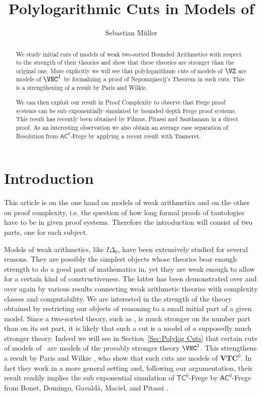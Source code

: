 \documentclass{LMCS}
\title{Polylogarithmic Cuts in Models of \VZ}
\author[S.~M\"uller]{Sebastian M\"uller}
\begin{document}
\begin{abstract}
  We study initial cuts of models of weak two-sorted Bounded
  Arithmetics with respect to the strength of their theories and show
  that these theories are stronger than the original one. More
  explicitly we will see that polylogarithmic cuts of models of $\VZ$
  are models of $\VNC^1$ by formalizing a proof of Nepomnjascij's
  Theorem in such cuts.  This is a strengthening of a result by Paris
  and Wilkie.

  We can then exploit our result in Proof Complexity to observe that
  Frege proof systems can be sub exponentially simulated by bounded
  depth Frege proof systems. This result has recently been obtained by
  Filmus, Pitassi and Santhanam in a direct proof. As an
  interesting observation we also obtain an average case separation of
  Resolution from $\mathsf{AC}^0$-Frege by applying a recent result
  with Tzameret.
\end{abstract}


\maketitle


\section{Introduction}

This article is on the one hand on models of weak arithmetics and on the other on proof complexity, i.e. the
question of how long formal proofs of tautologies have to be in given proof systems. Therefore the introduction
will consist of two parts, one for each subject.

Models of weak arithmetics, like $I\Delta_0$, have been extensively studied for several reasons. They are
possibly the simplest objects whose theories bear enough strength to do a good part of mathematics in, yet they
are weak enough to allow for a certain kind of constructiveness. The latter has been demonstrated over and over
again by various results connecting weak arithmetic theories with complexity classes and computability. We are
interested in the strength of the theory obtained by restricting our objects of reasoning to a small initial
part of a given model. Since a two-sorted theory, such as \VZ, is much stronger on its number part than on its
set part, it is likely that such a cut is a model of a supposedly much stronger theory. Indeed we will see in
Section~\ref{Sec:Polylog Cuts} that certain cuts of models of \VZ\ are models of the provably stronger theory
$\VNC^1$. This strengthens a result by Paris and Wilkie \cite{PW87}\cite{PW85}, who show that such cuts are
models of $\mathbf{VTC}^0$. In fact they work in a more general setting and, following our argumentation, their
result readily implies the sub exponential simulation of $\mathsf{TC}^0$-Frege by $\mathsf{AC}^0$-Frege from
Bonet, Domingo, Gavald\`a, Maciel, and Pitassi \cite{BDGMP04}.
\end{document}
